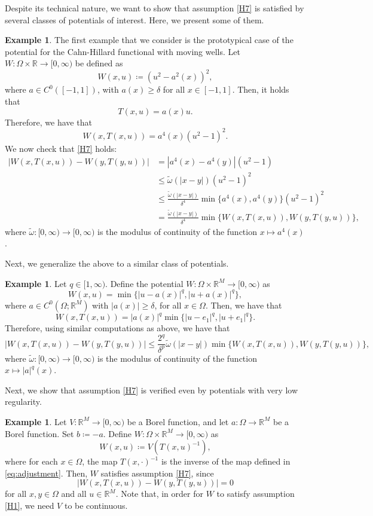 \documentclass[a4paper, 11pt, reqno]{amsart}
\theoremstyle{plain}
\theoremstyle{definition}
\newtheorem{example}[theorem]{Example}
\theoremstyle{remark}
\newcommand{\R}{\mathbb R}
\begin{document}
Despite its technical nature, we want to show that assumption \ref{H7} is satisfied by several classes of potentials of interest. Here, we present some of them.

\begin{example}
The first example that we consider is the prototypical case of the potential for the Cahn-Hillard functional with moving wells.
Let $W \colon \Omega\times\R\to[0,\infty)$ be defined as
\[
    W(x,u) \coloneqq (u^2-a^2(x))^2,
\]
where $a\in C^0([-1,1])$, with $a(x)\geq \delta$ for all $x\in [-1,1]$. Then, it holds that
\[
T(x,u) = a(x)u.
\]
Therefore, we have that
\[
W(x,T(x,u)) = a^4(x)(u^2-1)^2.
\]
We now check that \ref{H7} holds:
\begin{align*}
| W(x, T(x,u)) - W(y, T(y,u)) | &= |a^4(x) - a^4(y)| (u^2-1) \\
    &\leq \widetilde{\omega}(|x-y|) (u^2-1)^2 \\
    &\leq \frac{\widetilde{\omega}(|x-y|)}{\delta^4} \min\{a^4(x), a^4(y)\} (u^2-1)^2 \\
    &= \frac{\widetilde{\omega}(|x-y|)}{\delta^4} \min\{ W(x, T(x,u)), W(y, T(y,u)) \},
\end{align*}
where $\widetilde{\omega} \colon [0,\infty)\to[0,\infty)$ is the modulus of continuity of the function $x\mapsto a^4(x)$.
\end{example}

Next, we generalize the above to a similar class of potentials.

\begin{example}
Let $q\in[1,\infty)$.
Define the potential $W\colon\Omega\times\R^M\to[0,\infty)$ as
    \[
        W(x, u) = \min \{ |u - a(x)|^q, |u + a(x)|^q \},
    \]
    where $a \in C^0(\Omega;\R^M)$ with $|a(x)|\geq \delta$, for all $x\in\Omega$.
    Then, we have that
    \[
        W(x, T(x,u)) = |a(x)|^q\min \{ |u - e_1|^q, |u + e_1|^q \}.
    \]
    Therefore, using similar computations as above, we have that
    \[
        |W(x, T(x,u)) - W(y, T(y,u))|
        \leq \frac{2^q}{\delta^p}\widetilde{\omega}(|x - y|)\min \{W(x, T(x,u)), W(y, T(y,u)) \},
    \]
    where $\widetilde{\omega}\colon[0,\infty)\to[0,\infty)$ is the modulus of continuity of the function $x\mapsto |a|^q(x)$.
\end{example}

Next, we show that assumption \ref{H7} is verified even by potentials with very low regularity.

\begin{example}
Let $V\colon\R^M\to[0,\infty)$ be a Borel function, and let $a\colon\Omega\to\R^M$ be a Borel function. Set $b\coloneqq -a$.
Define $W\colon\Omega\times\R^M\to[0,\infty)$ as
\[
W(x,u)\coloneqq V(T(x,u)^{-1}),
\]
where for each $x \in \Omega$, the map $T(x, \cdot)^{-1}$ is the inverse of the map defined in \eqref{eq:adjustment}.
Then, $W$ satisfies assumption \ref{H7}, since
\[
|W(x, T(x,u)) - W(y, T(y,u))|=0
\]
for all $x,y\in\Omega$ and all $u\in\R^M$.
Note that, in order for $W$ to satisfy assumption \ref{H1}, we need $V$ to be continuous.
\end{example}
\end{document}
